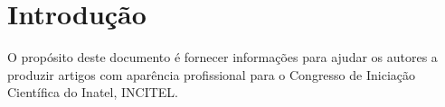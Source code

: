 \section{Introdução}

  O propósito deste documento é fornecer informações para ajudar os autores a produzir artigos com aparência profissional para o Congresso de Iniciação Científica do Inatel, INCITEL.
